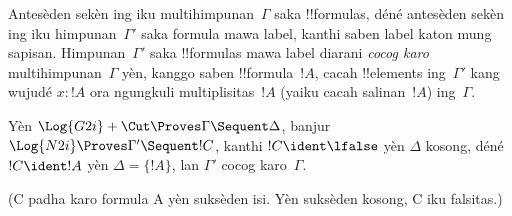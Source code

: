 \documentclass[../../../include/open-logic-section]{subfiles}
\begin{document}


Antesèden sekèn ing  iku multihimpunan~$\Gamma$
saka !!{formula}s, déné antesèden sekèn ing  iku
himpunan~$\Gamma'$ saka formula mawa label, kanthi saben label
katon mung sapisan. Himpunan~$\Gamma'$ saka !!{formula}s mawa label
diarani \emph{cocog karo} multihimpunan~$\Gamma$ yèn, kanggo
saben !!{formula}~$!A$, cacah !!{element}s ing~$\Gamma'$ kang wujudé
$x : !A$ ora ngungkuli multiplisitas~$!A$ (yaiku cacah salinan~$!A$)
ing~$\Gamma$.

\begin{prop}
Yèn $\Log{G2i} + \Cut \Proves \Gamma \Sequent \Delta$,
banjur $\Log{N2i} \Proves \Gamma' \Sequent !C$,
kanthi $!C \ident \lfalse$ yèn $\Delta$ kosong, déné $!C \ident !A$ yèn
$\Delta = \{!A\}$, lan
$\Gamma'$ cocog karo~$\Gamma$.
\end{prop}
(C padha karo formula A yèn suksèden isi. Yèn suksèden kosong, C iku falsitas.)
\end{document}
